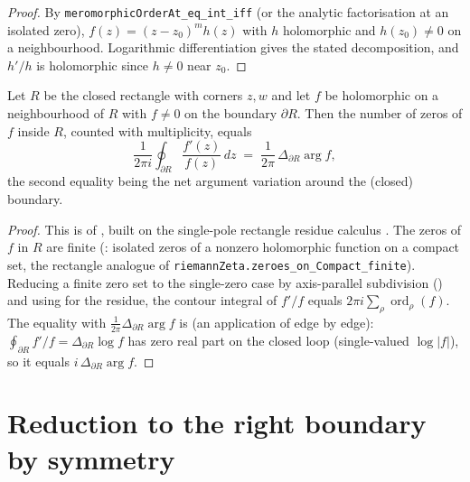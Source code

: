 \begin{proof}
\leanok
By \texttt{meromorphicOrderAt\_eq\_int\_iff} (or the analytic factorisation at an
isolated zero), $f(z)=(z-z_0)^m h(z)$ with $h$ holomorphic and $h(z_0)\neq0$ on a
neighbourhood. Logarithmic differentiation gives the stated decomposition, and
$h'/h$ is holomorphic since $h\neq0$ near $z_0$.
\end{proof}

\begin{theorem}
\label{thm:nf_argument_principle}
\leanok
{}
Let $R$ be the closed rectangle with corners $z,w$ and let $f$ be holomorphic on a
neighbourhood of $R$ with $f\neq0$ on the boundary $\partial R$. Then the number of
zeros of $f$ inside $R$, counted with multiplicity, equals
\[
  \frac{1}{2\pi i}\oint_{\partial R}\frac{f'(z)}{f(z)}\,dz
  \;=\; \frac{1}{2\pi}\,\Delta_{\partial R}\arg f ,
\]
the second equality being the net argument variation around the (closed) boundary.
\end{theorem}

\begin{proof}
\leanok
{}
This is  of , built on the single-pole rectangle residue calculus
. The zeros of $f$ in $R$ are finite
(: isolated zeros of a nonzero holomorphic function on a
compact set, the rectangle analogue of \texttt{riemannZeta.zeroes\_on\_Compact\_finite}).
Reducing a finite zero set to the single-zero case by axis-parallel subdivision
() and using  for the residue,
the contour integral of $f'/f$ equals $2\pi i\sum_\rho \operatorname{ord}_\rho(f)$.
The equality with $\tfrac{1}{2\pi}\Delta_{\partial R}\arg f$ is
 (an application of  edge by
edge): $\oint_{\partial R} f'/f = \Delta_{\partial R}\log f$ has zero real part on the
closed loop (single-valued $\log|f|$), so it equals $i\,\Delta_{\partial R}\arg f$.
\end{proof}

\section{Reduction to the right boundary by symmetry}
\label{sec:nf_reduction}

